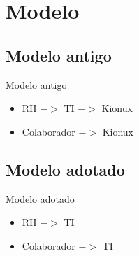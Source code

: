 \renewcommand{\titulo}{Modelo}
\section{\titulo}

\renewcommand{\titulo}{Modelo antigo}
\subsection{\titulo}
\begin{frame}{\titulo}
\begin{itemize}
\item RH $->$ TI $->$ Kionux
\item Colaborador $->$ Kionux
\end{itemize}
\end{frame}

\renewcommand{\titulo}{Modelo adotado}
\subsection{\titulo}
\begin{frame}{\titulo}
\begin{itemize}
\item RH $->$ TI
\item Colaborador $->$ TI
\end{itemize}
\end{frame}
